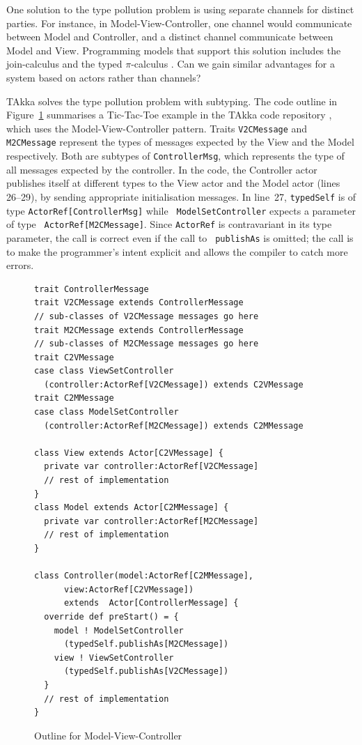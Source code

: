 







One solution to the type pollution problem is using separate channels
for distinct parties.  For instance, in Model-View-Controller, one
channel would communicate between Model and Controller, and a distinct
channel communicate between Model and View.  Programming models that
support this solution includes the join-calculus \cite{full_join} and
the typed $\pi$-calculus \cite{pi_book}.  
Can we gain similar
advantages for a system based on actors rather than channels?

TAkka solves the type pollution problem with subtyping.  The code
outline in Figure~\ref{MVC} summarises a Tic-Tac-Toe example in the
TAkka code repository \cite{takka_repo}, which uses the
Model-View-Controller pattern.  Traits {\tt V2CMessage} and {\tt
  M2CMessage} represent the types of messages expected by the View and
the Model respectively.  Both are subtypes of {\tt ControllerMsg},
which represents the type of all messages expected by the controller.
In the code, the Controller actor publishes itself at different types
to the View actor and the Model actor (lines 26--29), by sending
appropriate initialisation messages.  In line~27, {\tt typedSelf}
is of type {\tt ActorRef[ControllerMsg]} while {\tt
  ModelSetController} expects a parameter of type {\tt
  ActorRef[M2CMessage]}. Since {\tt ActorRef} is contravariant in its
type parameter, the call is correct even if the call to {\tt
  publishAs} is omitted; the call is to make the programmer's intent
explicit and allows the compiler to catch more errors.


\begin{figure}[!h]
\label{MVC}
\begin{lstlisting}
trait ControllerMessage
trait V2CMessage extends ControllerMessage
// sub-classes of V2CMessage messages go here
trait M2CMessage extends ControllerMessage
// sub-classes of M2CMessage messages go here
trait C2VMessage
case class ViewSetController
  (controller:ActorRef[V2CMessage]) extends C2VMessage
trait C2MMessage
case class ModelSetController
  (controller:ActorRef[M2CMessage]) extends C2MMessage

class View extends Actor[C2VMessage] {
  private var controller:ActorRef[V2CMessage]
  // rest of implementation
}
class Model extends Actor[C2MMessage] {
  private var controller:ActorRef[M2CMessage]
  // rest of implementation
}

class Controller(model:ActorRef[C2MMessage], 
      view:ActorRef[C2VMessage]) 
      extends  Actor[ControllerMessage] {
  override def preStart() = {
    model ! ModelSetController
      (typedSelf.publishAs[M2CMessage])
    view ! ViewSetController
      (typedSelf.publishAs[V2CMessage])
  }
  // rest of implementation
}
\end{lstlisting}
\caption{Outline for Model-View-Controller}
\vspace{-15pt}
\end{figure}

